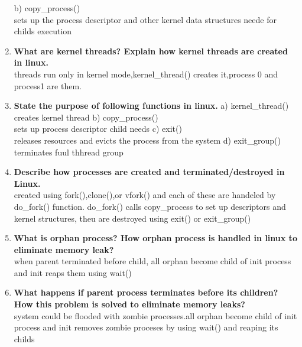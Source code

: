 \documentclass[a4paper,12pt]{article}
\begin{document}
\begin{flushleft}
\begin{enumerate}
 b) copy\_process()\\{\color{red}sets up the process descriptor and other kernel data structures neede for childs execution}
\item \textbf{ What are kernel threads? Explain how kernel threads are created in linux.}\\
{\color{red}threads run only in kernel mode,kernel\_thread() creates it,process 0 and process1 are them.}
\item \textbf{ State the purpose of following functions in linux.}
a) kernel\_thread()\\{\color{red}creates kernel thread}
 b) copy\_process() \\{\color{red}sets up process descriptor child needs}
 c) exit() \\{\color{red}releases resources and evicts the process from the system}
 d) exit\_group()\\{\color{red}terminates fuul thhread group}
\item \textbf{ Describe how processes are created and terminated/destroyed in Linux.}\\
{\color{red}created using fork(),clone(),or vfork() and each of these are handeled by do\_fork() function. do\_fork() calls copy\_process to set up descriptors and kernel structures,
theu are destroyed using exit() or exit\_group()}
\item \textbf{ What is orphan process? How orphan process is handled in linux to eliminate memory leak?}\\
{\color{red}when parent terminated before child, all orphan become child of init process and init reaps them using wait()}
\item \textbf{ What happens if parent process terminates before its children? How this problem is solved to eliminate memory leaks?}\\
{\color{red}system could be flooded with zombie processes.all orphan become child of init process and init removes zombie proceses by using wait() and reaping its childs}
\end{enumerate}


\end{flushleft}
\end{document}
